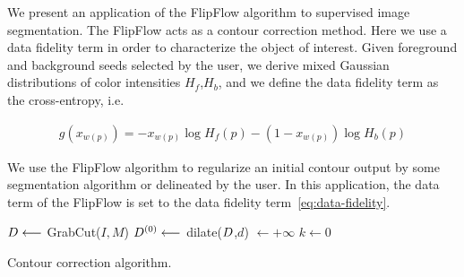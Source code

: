 We present an application of the FlipFlow algorithm to supervised image segmentation. The FlipFlow acts as a contour correction method. Here we use a data fidelity term in order to characterize the object of interest. Given foreground and background seeds selected by the user, we derive mixed Gaussian distributions of color intensities $H_f$,$H_b$, and we define the data fidelity term as the cross-entropy, i.e.
	
\begin{align}
  g(x_{w(p)}) = -x_{w(p)}\log{H_f(p)} - (1-x_{w(p)})\log{H_b(p)}
  \label{eq:data-fidelity}
\end{align}	

We use the FlipFlow algorithm to regularize an initial contour output by some segmentation algorithm or delineated by the user. In this application, the data term of the FlipFlow
is set to the data fidelity term~\cref{eq:data-fidelity}.
	
\begin{algorithm}
 
 \BlankLine

 $D \longleftarrow$ GrabCut($I,M$)\;
 $D^{(0)} \longleftarrow $ dilate($D$,$d$)\; 
 \Delta $\longleftarrow +\infty$\;
 $k \longleftarrow 0$\;
 \caption{Contour correction algorithm.}
  \label{alg:contour-correction} 
\end{algorithm}	


